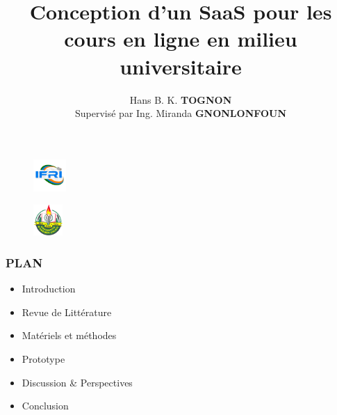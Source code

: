 \documentclass{beamer}
\title{Conception d'un SaaS pour les cours en ligne en milieu universitaire}
\author[Hans TOGNON]{Hans B. K. \textbf{TOGNON} \\ Supervisé par Ing. Miranda \textbf{GNONLONFOUN}}
\institute[IFRI]{
\textbf{I}nstitut de \textbf{F}ormation et de \textbf{R}echerche en  \textbf{I}nformatique \\
\medskip
}
\begin{document}
\begin{frame}
  \thispagestyle{empty}
  \begin{multicols}{2}
    \begin{figure}
        \flushleft
        \includegraphics[width=0.11\textwidth]{logoifri}
    \end{figure}
    \begin{figure}
        \flushright
        \includegraphics[width=0.1\textwidth]{logouac}
    \end{figure}
    \end{multicols}
    \vspace{-1cm}
  \titlepage
  \end{frame}

\begin{frame}
  \frametitle{PLAN}
  \begin{itemize}
    \item Introduction
    \item Revue de Littérature
    \item Matériels et méthodes
    \item Prototype
    \item Discussion \& Perspectives
    \item Conclusion
  \end{itemize}
\end{frame}



\end{document}
